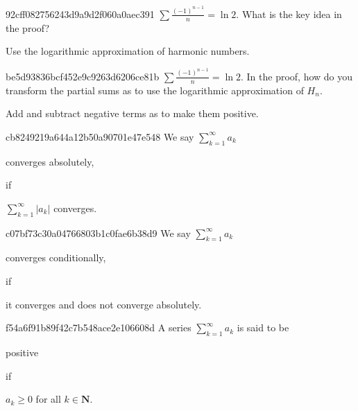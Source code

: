 \begin{note}{92cff082756243d9a9d2f060a0aec391}
    \({ \sum \frac{(-1)^{n-1}}{n} = \ln 2 }\).
    What is the key idea in the proof?

    \begin{cloze}{1}
        Use the logarithmic approximation of harmonic numbers.
    \end{cloze}
\end{note}

\begin{note}{be5d93836bcf452e9c9263d6206ce81b}
    \({ \sum \frac{(-1)^{n-1}}{n} = \ln 2 }\).
    In the proof, how do you transform the partial sums as to use the logarithmic approximation of \({ H_n }\).

    \begin{cloze}{1}
        Add and subtract negative terms as to make them positive.
    \end{cloze}
\end{note}

\begin{note}{cb8249219a644a12b50a90701e47e548}
    We say \({ \sum_{k=1}^{\infty} a_k }\) \begin{icloze}{2}converges absolutely,\end{icloze} if \begin{icloze}{1}\({ \sum_{k=1}^{\infty} \left\lvert a_k \right\rvert }\) converges.\end{icloze}
\end{note}

\begin{note}{c07bf73c30a04766803b1c0fae6b38d9}
    We say \({ \sum_{k=1}^{\infty} a_k }\) \begin{icloze}{2}converges conditionally,\end{icloze} if \begin{icloze}{1}it converges and does not converge absolutely.\end{icloze}
\end{note}

\begin{note}{f54a6f91b89f42c7b548ace2e106608d}
    A series \({ \sum_{k=1}^{\infty} a_k }\) is said to be \begin{icloze}{2}positive\end{icloze} if \begin{icloze}{1}\({ a_k \geq 0 }\) for all \({ k \in \mathbf{N} }\).\end{icloze}
\end{note}


